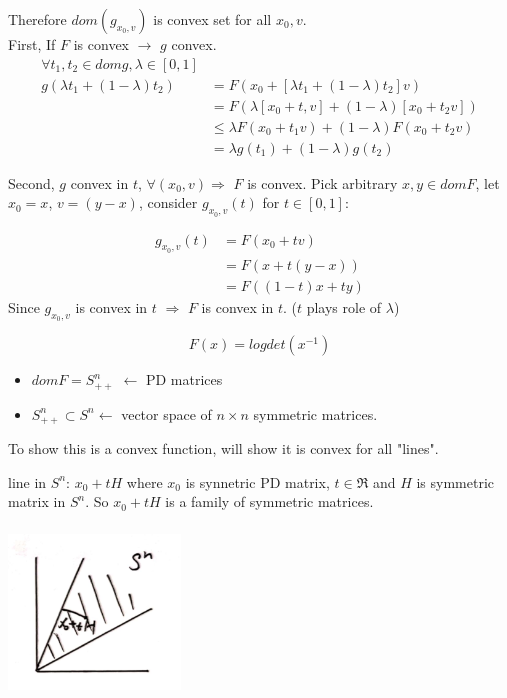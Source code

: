 Therefore $dom(g_{x_0, v})$ is convex set for all $x_0, v$.\\

First, If $F$ is convex $\rightarrow$ $g$ convex. 
\begin{align*}
\forall t_1, t_2\in domg, \lambda\in [0,1]\\
g(\lambda t_1 +(1-\lambda)t_2) &= F(x_0+[\lambda t_1+(1-\lambda)t_2]v)\\
&= F(\lambda[x_0 +t, v]+(1-\lambda)[x_0+t_2v])\\
&\leq \lambda F(x_0+t_1 v)+(1-\lambda)F(x_0+t_2v)\\
&=\lambda g(t_1) + (1-\lambda)g(t_2)
\end{align*}

Second, $g$ convex in $t$, $\forall(x_0, v)\Rightarrow$ $F$ is convex. Pick arbitrary $x,y\in domF$, let $x_0 =x$, $v=(y-x)$, consider $g_{x_0, v}(t)$ for $t\in[0,1]$:

\begin{align*}
g_{x_0, v}(t) &= F(x_0+tv)\\
&= F(x+t(y-x))\\
&= F((1-t)x+ty)
\end{align*}
Since $g_{x_0, v}$ is convex in $t$ $\Rightarrow$ $F$ is convex in $t$. ($t$ plays role of $\lambda$)

\begin{example}
	


\begin{equation*}
F(x) =logdet(x^{-1})
\end{equation*}

\begin{itemize}
	\item $domF = S^n_{++}$ $\leftarrow$ PD matrices
	
	\item $S^n_{++} \subset S^n \leftarrow$ vector space of $n\times n$ symmetric matrices. 
\end{itemize}
To show this is a convex function, will show it is convex for all "lines".

line in $S^n$: $x_0 + tH$ where $x_0$ is synnetric PD matrix, $t\in \Re$ and $H$ is symmetric matrix in $S^n$. So $x_0 + tH$ is a family of symmetric matrices.

\begin{marginfigure}
	\centering
	\includegraphics[width=1.8in,height=1.8in]{figures/ch08/figure1104_3.png}
\end{marginfigure}
\end{example}

